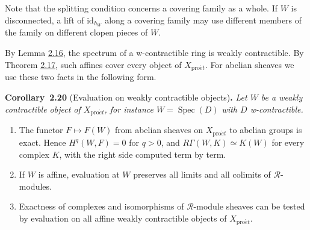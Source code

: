 \documentclass[11pt]{article}
\newenvironment{bpstatement}[2]{\par\addvspace{0.6\baselineskip}\noindent\textbf{#1}#2\textbf{.}\enspace\ignorespaces}
  {\par\addvspace{0.4\baselineskip}}
\newenvironment{bpstatementit}[2]{\begin{bpstatement}{#1}{#2}\itshape\ignorespaces}{\end{bpstatement}}
\begin{document}
\label{bp58}%
Note that the splitting condition concerns a covering family as a whole. If \(W\) is disconnected, a lift of \(\mathrm{id}_{h_W}\) along a covering family may use different members of the family on different clopen pieces of \(W\).

By Lemma \hyperref[bp49]{2.16}, the spectrum of a w-contractible ring is weakly contractible. By Theorem \hyperref[bp51]{2.17}, such affines cover every object of \(X_{\mathrm{pro}\acute{e}t}\). For abelian sheaves we use these two facts in the following form.

\label{bp59}%
\begin{bpstatementit}{Corollary~2.20}{ (Evaluation on weakly contractible objects)}
Let \(W\) be a weakly contractible object of \(X_{\mathrm{pro}\acute{e}t}\), for instance \(W=\operatorname{Spec}(D)\) with \(D\) w-contractible.

\begin{enumerate}
\item The functor \(F\mapsto F(W)\) from abelian sheaves on \(X_{\mathrm{pro}\acute{e}t}\) to abelian groups is exact. Hence \(H^q(W,F)=0\) for \(q>0\), and \(R\Gamma(W,K)\simeq K(W)\) for every complex \(K\), with the right side computed term by term.
\item If \(W\) is affine, evaluation at \(W\) preserves all limits and all colimits of \(\mathcal R\)-modules.
\item Exactness of complexes and isomorphisms of \(\mathcal R\)-module sheaves can be tested by evaluation on all affine weakly contractible objects of \(X_{\mathrm{pro}\acute{e}t}\).
\end{enumerate}
\end{bpstatementit}
\end{document}
